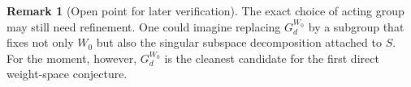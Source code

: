 \documentclass{article}
\theoremstyle{definition}
\newtheorem{remark}[theorem]{Remark}
\begin{document}
\begin{remark}[Open point for later verification]
The exact choice of acting group may still need refinement. One could imagine replacing $G_d^{W_0}$ by a subgroup that fixes not only $W_0$ but also the singular subspace decomposition attached to $S$. For the moment, however, $G_d^{W_0}$ is the cleanest candidate for the first direct weight-space conjecture.
\end{remark}
\end{document}

